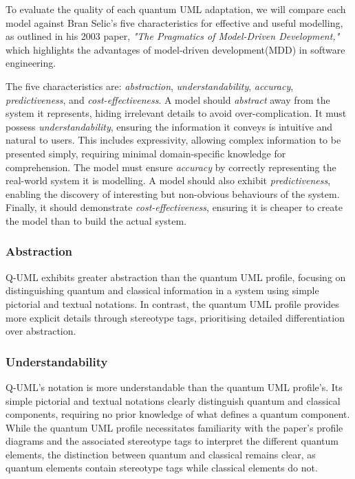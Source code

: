 \documentclass{article}
\begin{document}
To evaluate the quality of each quantum UML adaptation, we will compare each model against Bran Selic's five characteristics for effective and useful modelling, as outlined in his 2003 paper, \textit{"The Pragmatics of Model-Driven Development,"} which highlights the advantages of model-driven development(MDD) in software engineering\cite{1231146}.

The five characteristics are: \textit{abstraction}, \textit{understandability}, \textit{accuracy}, \textit{predictiveness}, and \textit{cost-effectiveness}. A model should \textit{abstract} away from the system it represents, hiding irrelevant details to avoid over-complication. It must possess \textit{understandability}, ensuring the information it conveys is intuitive and natural to users. This includes expressivity, allowing complex information to be presented simply, requiring minimal domain-specific knowledge for comprehension. The model must ensure \textit{accuracy} by correctly representing the real-world system it is modelling. A model should also exhibit \textit{predictiveness}, enabling the discovery of interesting but non-obvious behaviours of the system. Finally, it should demonstrate \textit{cost-effectiveness}, ensuring it is cheaper to create the model than to build the actual system\cite{1231146}.

\subsubsection{Abstraction}

Q-UML exhibits greater abstraction than the quantum UML profile, focusing on distinguishing quantum and classical information in a system using simple pictorial and textual notations. In contrast, the quantum UML profile provides more explicit details through stereotype tags, prioritising detailed differentiation over abstraction.

\subsubsection{Understandability}

Q-UML's notation is more understandable than the quantum UML profile's. Its simple pictorial and textual notations clearly distinguish quantum and classical components, requiring no prior knowledge of what defines a quantum component. While the quantum UML profile necessitates familiarity with the paper's profile diagrams and the associated stereotype tags to interpret the different quantum elements, the distinction between quantum and classical remains clear, as quantum elements contain stereotype tags while classical elements do not.
\end{document}
